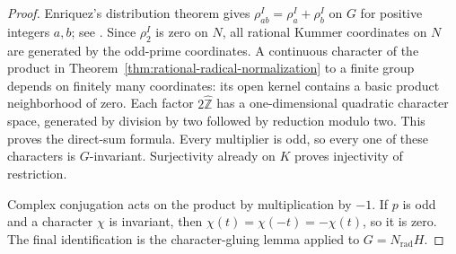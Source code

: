 \begin{proof}
Enriquez's distribution theorem gives
$\rho_{ab}^I=\rho_a^I+\rho_b^I$ on $G$ for positive integers
$a,b$; see \cite[Theorem~8.1 and Remark~8.6, author pp.~30--32]{Enriquez2007}.
Since $\rho_2^I$ is zero on $N$, all rational Kummer coordinates
on $N$ are generated by the odd-prime coordinates.
A continuous character of the product in
Theorem~\ref{thm:rational-radical-normalization} to a finite group
depends on finitely many coordinates: its open kernel contains
a basic product neighborhood of zero. Each factor
$2\widehat{\mathbb Z}$ has a one-dimensional quadratic character
space, generated by division by two followed by reduction modulo
two. This proves the direct-sum formula. Every multiplier is odd,
so every one of these characters is $G$-invariant. Surjectivity
already on $K$ proves injectivity of restriction.

Complex conjugation acts on the product by multiplication by $-1$.
If $p$ is odd and a character $\chi$ is invariant, then
$\chi(t)=\chi(-t)=-\chi(t)$, so it is zero. The final identification
is the character-gluing lemma applied to
$G=N_{\mathrm{rad}}H$.
\end{proof}

